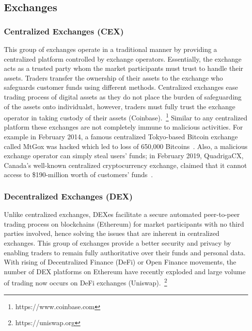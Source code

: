 \subsection{Exchanges}

\subsubsection{Centralized Exchanges (CEX)}\label{sec:CEX}

This group of exchanges operate in a traditional manner by providing a centralized platform controlled by exchange operators. Essentially, the exchange acts as a trusted party whom the market participants must trust to handle their assets. Traders transfer the ownership of their assets to the exchange who safeguards customer funds using different methods. Centralized exchanges ease trading process of digital assets as they do not place the burden of safeguarding of the assets onto individualst, however, traders must fully trust the exchange operator in taking custody of their assets (\eg Coinbase).~\footnote{https://www.coinbase.com} Similar to any centralized platform these exchanges are not completely immune to malicious activities. For example in February 2014, a famous centralized Tokyo-based Bitcoin exchange called MtGox was hacked which led to loss of 650,000 Bitcoins~\cite{TheHisto45:online}. Also, a malicious exchange operator can simply steal users' funds; in February 2019, QuadrigaCX, Canada’s well-known centralized cryptocurrency exchange, claimed that it cannot access to \$190-million worth of customers’ funds~\cite{SEBIOrde83:online}.


\subsubsection{Decentralized Exchanges (DEX)}

Unlike centralized exchanges, DEXes facilitate a secure automated peer-to-peer trading process on blockchains (\eg Ethereum) for market participants with no third parties involved, hence solving the issues that are inherent in centralized exchanges. This group of exchanges provide a better security and privacy by enabling traders to remain fully authoritative over their funds and personal data. With rising of Decentralized Finance (DeFi) or Open Finance movements, the number of DEX platforms on Ethereum have recently exploded and large volume of trading now occurs on DeFi exchanges (\eg Uniswap).~\footnote{https://uniswap.org}


